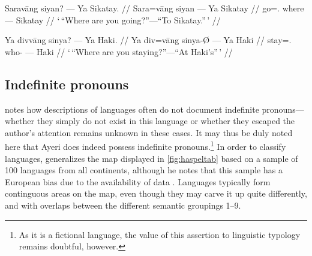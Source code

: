 \pex
\a\begingl
	\gla Saravāng siyan? --- Ya Sikatay. //
	\glb Sara=vāng siyan --- Ya Sikatay //
	\glc go=\Ssg{}.\Aarg{} where --- \Loc{} Sikatay //
	\glft `\,\enquote{Where are you going?}---\enquote{To Sikatay.}\,' //
\endgl

\a\begingl
	\gla Ya divvāng sinya? --- Ya Haki. //
	\glb Ya div=vāng sinya-Ø --- Ya Haki //
	\glc \LocT{} stay=\Ssg{}.\Aarg{} who-\Top{} --- \Loc{} Haki //
	\glft `\,\enquote{Where are you staying?}---\enquote{At Haki's}\,' //
\endgl

\xe


\subsection{Indefinite pronouns}
\label{subsec:indefpro}

\citet[56]{haspelmath1997} notes how descriptions of languages often do not 
document indefinite pronouns---whether they simply do not exist in this 
language or whether they escaped the author's attention remains unknown in 
these cases. It may thus be duly noted here that Ayeri does indeed possess 
indefinite pronouns.\footnote{As it is a fictional language, the value of this 
assertion to linguistic typology remains doubtful, however.} In order to 
classify languages, \citeauthor{haspelmath1997} generalizes the map displayed 
in \autoref{fig:haspeltab} based on a sample of 100 languages from all 
continents, although he notes that this sample has a European bias due to the 
availability of data \citep[2]{haspelmath1997}. Languages typically form 
continguous areas on the map, even though they may carve it up quite 
differently, and with overlaps between the different semantic groupings 1--9.


